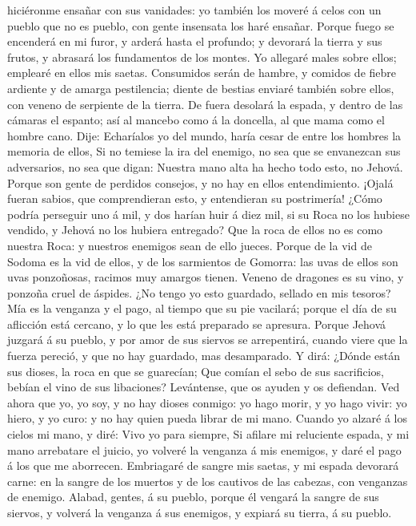 hiciéronme ensañar con sus vanidades: yo también los moveré á celos con
un pueblo que no es pueblo, con gente insensata los haré ensañar.
 Porque fuego se encenderá en mi furor, y arderá hasta el
profundo; y devorará la tierra y sus frutos, y abrasará los fundamentos
de los montes.  Yo allegaré males sobre ellos; emplearé
en ellos mis saetas.  Consumidos serán de hambre, y
comidos de fiebre ardiente y de amarga pestilencia; diente de bestias
enviaré también sobre ellos, con veneno de serpiente de la tierra.
 De fuera desolará la espada, y dentro de las cámaras el
espanto; así al mancebo como á la doncella, al que mama como el hombre
cano.  Dije: Echaríalos yo del mundo, haría cesar de
entre los hombres la memoria de ellos,  Si no temiese la
ira del enemigo, no sea que se envanezcan sus adversarios, no sea que
digan: Nuestra mano alta ha hecho todo esto, no Jehová. 
Porque son gente de perdidos consejos, y no hay en ellos entendimiento.
 ¡Ojalá fueran sabios, que comprendieran esto, y
entendieran su postrimería!  ¿Cómo podría perseguir uno á
mil, y dos harían huir á diez mil, si su Roca no los hubiese vendido, y
Jehová no los hubiera entregado?  Que la roca de ellos no
es como nuestra Roca: y nuestros enemigos sean de ello jueces.
 Porque de la vid de Sodoma es la vid de ellos, y de los
sarmientos de Gomorra: las uvas de ellos son uvas ponzoñosas, racimos
muy amargos tienen.  Veneno de dragones es su vino, y
ponzoña cruel de áspides.  ¿No tengo yo esto guardado,
sellado en mis tesoros?  Mía es la venganza y el pago, al
tiempo que su pie vacilará; porque el día de su aflicción está cercano,
y lo que les está preparado se apresura.  Porque Jehová
juzgará á su pueblo, y por amor de sus siervos se arrepentirá, cuando
viere que la fuerza pereció, y que no hay guardado, mas desamparado.
 Y dirá: ¿Dónde están sus dioses, la roca en que se
guarecían;  Que comían el sebo de sus sacrificios, bebían
el vino de sus libaciones? Levántense, que os ayuden y os defiendan.
 Ved ahora que yo, yo soy, y no hay dioses conmigo: yo
hago morir, y yo hago vivir: yo hiero, y yo curo: y no hay quien pueda
librar de mi mano.  Cuando yo alzaré á los cielos mi
mano, y diré: Vivo yo para siempre,  Si afilare mi
reluciente espada, y mi mano arrebatare el juicio, yo volveré la
venganza á mis enemigos, y daré el pago á los que me aborrecen.
 Embriagaré de sangre mis saetas, y mi espada devorará
carne: en la sangre de los muertos y de los cautivos de las cabezas, con
venganzas de enemigo.  Alabad, gentes, á su pueblo,
porque él vengará la sangre de sus siervos, y volverá la venganza á sus
enemigos, y expiará su tierra, á su pueblo.

